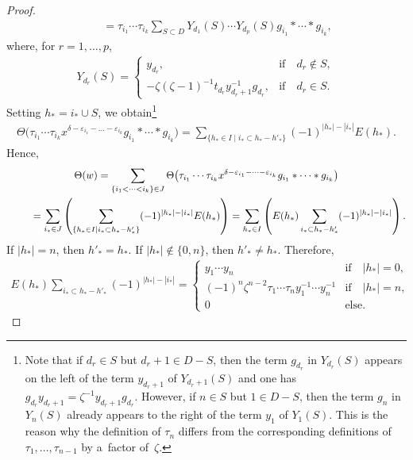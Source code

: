 \documentclass[pdftex]{sigma}
\numberwithin{equation}{section}
\begin{document}
\begin{proof}
\begin{gather*}
\qquad
= \tau_{i_1}\cdots \tau_{i_k} \sum\limits_{S\subset D} Y_{d_1}(S) \cdots Y_{d_p}(S) g_{i_1}*\cdots * g_{i_k},
\end{gather*}
where, for $r=1,\ldots, p$,
\begin{gather*}
Y_{d_r}(S) =
\begin{cases}
y_{d_r}, & \text{if} \quad d_r\notin S,
\\
- \zeta(\zeta-1)^{-1} t_{d_r}y_{d_r+1}^{-1}g_{d_r}, & \text{if} \quad d_r\in S.
\end{cases}
\end{gather*}
Setting $h_* = i_* \cup S$, we obtain\footnote{Note that if $d_r\in S$ but $d_r+1\in D-S$, then the term $g_{d_r}$ in
$Y_{d_r}(S)$ appears on the left of the term $y_{d_r+1}$ of $Y_{d_r+1}(S)$ and one has $g_{d_r} y_{d_r+1} = \zeta^{-1}
y_{d_r+1} g_{d_r}$.
However, if $n\in S$ but $1\in D-S$, then the term $g_n$ in $Y_n(S)$ already appears to the right of the term $y_1$ of
$Y_1(S)$.
This is the reason why the def\/inition of $\tau_n$ dif\/fers from the corresponding def\/initions of $\tau_1,\ldots,
\tau_{n-1}$ by a~factor of~$\zeta$.}
\begin{gather*}
\Theta\big(\tau_{i_1}\cdots \tau_{i_k} x^{\delta-\varepsilon_{i_1} - \dots - \varepsilon_{i_k}} g_{i_1}*\cdots * g_{i_k}\big) =
\sum\limits_{\{h_*\in I \mid i_*\subset h_*- h'_* \}} (-1)^{|h_*|-|i_*|} E(h_*).
\end{gather*}
Hence,
\begin{gather*}
\Theta(w) = \sum\limits_{\{i_1<\dots<i_k\}\in J} \Theta\big(\tau_{i_1}\cdots \tau_{i_k} x^{\delta-\varepsilon_{i_1} - \dots -
\varepsilon_{i_k}} g_{i_1}*\dots * g_{i_k}\big)
\\
\hphantom{\Theta(w)}{}
{} = \sum\limits_{i_*\in J} \left(\sum\limits_{\{h_*\in I \mid i_*\subset h_*- h'_*\}} (-1)^{|h_*|-|i_*|} E(h_*) \right)
 = \sum\limits_{h_*\in I} \left (E(h_*) \sum\limits_{i_*\subset h_*-h'_*} (-1)^{|h_*|-|i_*|} \right).
\end{gather*}
If $|h_*|=n$, then $h'_*= h_*$.
If $|h_*|\notin\{0,n\}$, then $h'_* \neq h_*$.
Therefore,
\begin{gather*}
E(h_*) \sum\limits_{i_*\subset h_*-h'_*} (-1)^{|h_*|-|i_*|} =
\begin{cases}
y_1\cdots y_n & \text{if} \quad |h_*|=0,
\\
(-1)^n \zeta^{n-2} \tau_1\cdots \tau_n y_1^{-1} \cdots y_n^{-1} & \text{if} \quad |h_*|=n,
\\
0 & \text{else.}
\end{cases}
\tag*{\qed}
\end{gather*}
\renewcommand{\qed}{}
\end{proof}
\end{document}
